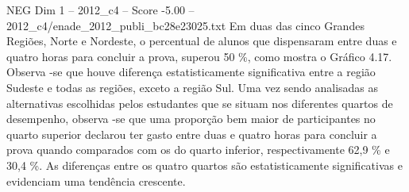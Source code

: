 \begin{textsample}{NEG Dim 1 – 2012\_c4 – Score -5.00 – 2012\_c4/enade\_2012\_publi\_bc28e23025.txt}
Em duas das cinco Grandes Regiões, Norte e Nordeste, o percentual de alunos que dispensaram entre duas e quatro horas para concluir a prova, superou 50 \%, como mostra o Gráfico 4.17.
Observa -se que houve diferença estatisticamente significativa entre a região Sudeste e todas as regiões, exceto a região Sul.
Uma vez sendo analisadas as alternativas escolhidas pelos estudantes que se situam nos diferentes quartos de desempenho, observa -se que uma proporção bem maior de participantes no quarto superior declarou ter gasto entre duas e quatro horas para concluir a prova quando comparados com os do quarto inferior, respectivamente 62,9 \% e 30,4 \%.
As diferenças entre os quatro quartos são estatisticamente significativas e evidenciam uma tendência crescente.

\end{textsample}
